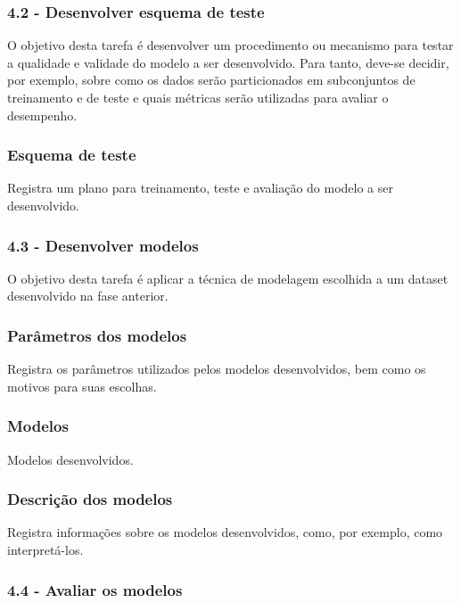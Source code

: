 \subsubsection*{\textbf{4.2 - Desenvolver esquema de teste}}

O objetivo desta tarefa é desenvolver um procedimento ou mecanismo para testar a qualidade e validade do modelo a ser desenvolvido. Para tanto, deve-se decidir, por exemplo, sobre como os dados serão particionados em subconjuntos de treinamento e de teste e quais métricas serão utilizadas para avaliar o desempenho.

\subsubsection*{Esquema de teste}

Registra um plano para treinamento, teste e avaliação do modelo a ser desenvolvido.

\subsubsection*{\textbf{4.3 - Desenvolver modelos}}

O objetivo desta tarefa é aplicar a técnica de modelagem escolhida a um dataset desenvolvido na fase anterior.

\subsubsection*{Parâmetros dos modelos}

Registra os parâmetros utilizados pelos modelos desenvolvidos, bem como os motivos para suas escolhas.

\subsubsection*{Modelos}

Modelos desenvolvidos.

\subsubsection*{Descrição dos modelos}

Registra informações sobre os modelos desenvolvidos, como, por exemplo, como interpretá-los.

\subsubsection*{\textbf{4.4 - Avaliar os modelos}}

